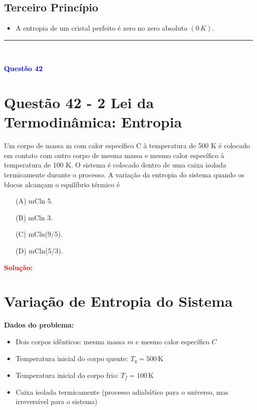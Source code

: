 \documentclass[a4paper,12pt]{article}
\begin{document}
\subsection*{Terceiro Princípio}
\begin{itemize}
    \item A entropia de um cristal perfeito é zero no zero absoluto $(0\,K)$.
\end{itemize}

\noindent\rule{\linewidth}{0.6pt}\\

\begin{flushleft}
\textbf{\textcolor{blue}{\Large Quest\~ao 42}}\\
\noindent
\section{Quest\~ao 42 - 2 Lei da Termodinâmica: Entropia}
Um corpo de massa m com calor específico C à temperatura
de 500 K é colocado em contato com outro corpo de mesma
massa e mesmo calor específico à temperatura de 100 K. O
sistema é colocado dentro de uma caixa isolada
termicamente durante o processo. A variação da entropia do
sistema quando os blocos alcançam o equilíbrio térmico é

\begin{itemize}
\item[(A)] mCln 5.
\item[(B)] mCln 3.
\item[(C)] mCln(9/5).
\item[(D)] mCln(5/3).
\end{itemize}

\vspace{0.5cm}

\textcolor{red}{\textbf{Solução:}}\\

\section*{Variação de Entropia do Sistema}

\textbf{Dados do problema:}
\begin{itemize}
    \item Dois corpos idênticos: mesma massa \(m\) e mesmo calor específico \(C\)
    \item Temperatura inicial do corpo quente: \(T_q = 500\,\mathrm{K}\)
    \item Temperatura inicial do corpo frio: \(T_f = 100\,\mathrm{K}\)
    \item Caixa isolada termicamente (processo adiabático para o universo, mas irreversível para o sistema)
\end{itemize}


\end{flushleft}
\end{document}
